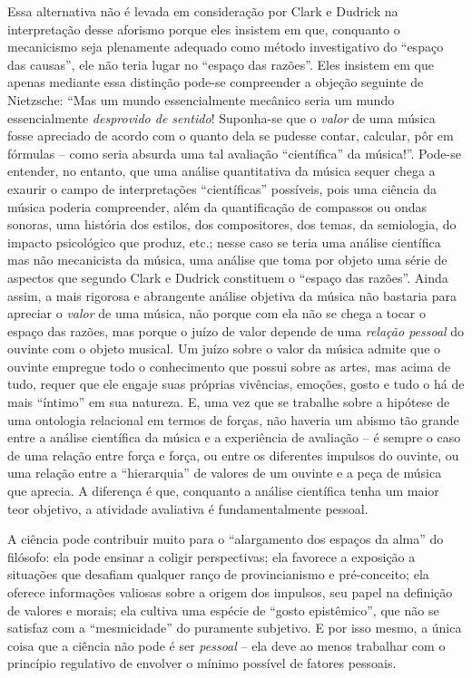 \documentclass[
	12pt,				%
	openright,			%
	oneside,			%
	a4paper,			%
	english,			%
	french,				%
	spanish,			%
	brazil				%
	]{abntex2}
\begin{document}
Essa alternativa não é levada em consideração por Clark e Dudrick na interpretação desse aforismo porque eles insistem em que, conquanto o mecanicismo seja plenamente adequado como método investigativo do “espaço das causas”, ele não teria lugar no “espaço das razões”. Eles insistem em que apenas mediante essa distinção pode-se compreender a objeção seguinte de Nietzsche: “Mas um mundo essencialmente mecânico seria um mundo essencialmente \textit{desprovido de sentido}! Suponha-se que o \textit{valor} de uma música fosse apreciado de acordo com o quanto dela se pudesse contar, calcular, pôr em fórmulas – como seria absurda uma tal avaliação “científica” da música!”. Pode-se entender, no entanto, que uma análise quantitativa da música sequer chega a exaurir o campo de interpretações “científicas” possíveis, pois uma ciência da música poderia compreender, além da quantificação de compassos ou ondas sonoras, uma história dos estilos, dos compositores, dos temas, da semiologia, do impacto psicológico que produz, etc.; nesse caso se teria uma análise científica mas não mecanicista da música, uma análise que toma por objeto uma série de aspectos que segundo Clark e Dudrick constituem o “espaço das razões”. Ainda assim, a mais rigorosa e abrangente análise objetiva da música não bastaria para apreciar o \textit{valor} de uma música, não porque com ela não se chega a tocar o espaço das razões, mas porque o juízo de valor depende de uma \textit{relação pessoal} do ouvinte com o objeto musical. Um juízo sobre o valor da música admite que o ouvinte empregue todo o conhecimento que possui sobre as artes, mas acima de tudo, requer que ele engaje suas próprias vivências, emoções, gosto e tudo o há de mais “íntimo” em sua natureza. E, uma vez que se trabalhe sobre a hipótese de uma ontologia relacional em termos de forças, não haveria um abismo tão grande entre a análise científica da música e a experiência de avaliação – é sempre o caso de uma relação entre força e força, ou entre os diferentes impulsos do ouvinte, ou uma relação entre a “hierarquia” de valores de um ouvinte e a peça de música que aprecia. A diferença é que, conquanto a análise científica tenha um maior teor objetivo, a atividade avaliativa é fundamentalmente pessoal.

	A ciência pode contribuir muito para o “alargamento dos espaços da alma” do filósofo: ela pode ensinar a coligir perspectivas; ela favorece a exposição a situações que desafiam qualquer ranço de provincianismo e pré-conceito; ela oferece informações valiosas sobre a origem dos impulsos, seu papel na definição de valores e morais; ela cultiva uma espécie de “gosto epistêmico”, que não se satisfaz com a “mesmicidade” do puramente subjetivo. E por isso mesmo, a única coisa que a ciência não pode é ser \textit{pessoal} – ela deve ao menos trabalhar com o princípio regulativo de envolver o mínimo possível de fatores pessoais. 
	
\end{document}
